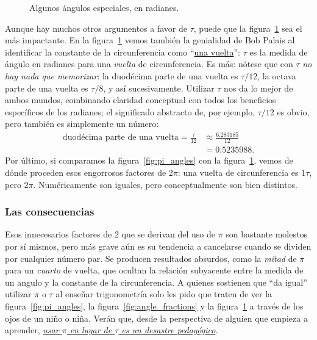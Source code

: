 \begin{figure}
\begin{center}
\end{center}
\caption{Algunos ángulos especiales, en radianes.\label{fig:tau_angles}}
\end{figure}

Aunque hay muchos otros argumentos a favor de $\tau$, puede que la figura~\ref{fig:tau_angles} sea el más impactante. En la figura~\ref{fig:tau_angles} vemos también la genialidad de Bob Palais al identificar la constante de la circunferencia como ``\href{https://es.wikipedia.org/wiki/Vuelta_(%C3%A1ngulo)}{una vuelta}'': $\tau$ es la medida de ángulo en radianes para una \emph{vuelta} de circunferencia. Es más: nótese que con $\tau$ \emph{no hay nada que memorizar}: la duodécima parte de una vuelta es $\tau/12$, la octava parte de una vuelta es $\tau/8$, y así sucesivamente. Utilizar $\tau$ nos da lo mejor de ambos mundos, combinando claridad conceptual con todos los beneficios específicos de los radianes; el significado abstracto de, por ejemplo, $\tau/12$ es obvio, pero también es simplemente un número:
\[
\begin{split}
\mbox{duodécima parte de una vuelta} = \frac{\tau}{12} & \approx \frac{6.283185}{12} \\
                                                       & = 0.5235988.
\end{split}
\]
Por último, si comparamos la figura~\ref{fig:pi_angles} con la figura~\ref{fig:tau_angles}, vemos de dónde proceden esos engorrosos factores de $2\pi$: una vuelta de circunferencia es $1\tau$, pero $2\pi$. Numéricamente son iguales, pero conceptualmente son bien distintos.

    \subsubsection{Las consecuencias} %
    \label{sec:the_ramifications}

Esos innecesarios factores de $2$ que se derivan del uso de $\pi$ son bastante molestos por sí mismos, pero más grave aún es su tendencia a cancelarse cuando se dividen por cualquier número par. Se producen resultados absurdos, como la  \emph{mitad} de $\pi$ para un \emph{cuarto} de vuelta, que ocultan la relación subyacente entre la medida de un angulo y la constante de la circunferencia. A quienes sostienen que ``da igual'' utilizar $\pi$ o $\tau$ al enseñar trigonometría solo les pido que traten de ver la figura~\ref{fig:pi_angles}, la figura~\ref{fig:angle_fractions} y la figura~\ref{fig:tau_angles} a través de los ojos de un niño o niña. Verán que, desde la perspectiva de alguien que empieza a aprender, \href{http://tauday.com/a-tau-testimonial}{\emph{usar $\pi$ en lugar de $\tau$ es un desastre pedagógico}}.

